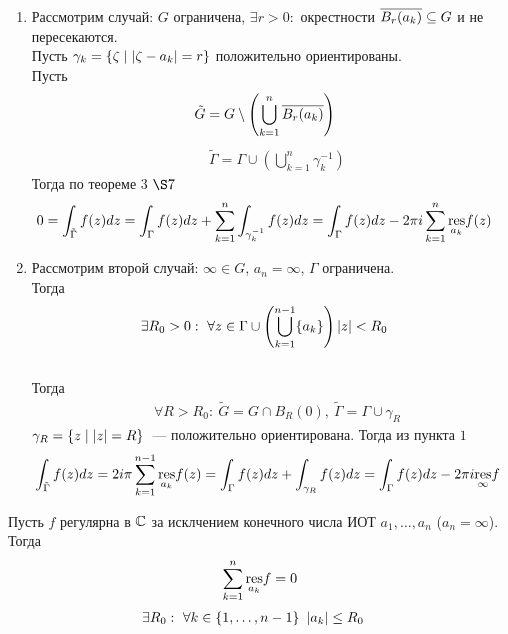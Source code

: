 \begin{enumerate}
    \item Рассмотрим случай: $G$ ограничена, $\exists r > 0:$ окрестности
    $\overline{B_r(a_k)}\subseteq G$ и не пересекаются.
    \\
    Пусть $\gamma_k = \{\zeta \mid \left|{\zeta - a_k}\right| = r\}$ положительно
    ориентированы.
    \\
    Пусть
    \begin{align*}
      & \tilde{G} = G \setminus \left( \bigcup_{k=1}^n\overline{B_r(a_k)} \right)
    \end{align*}
    \begin{align*}
      & \tilde{\Gamma} = \Gamma \cup \left( \bigcup_{k=1}^n  \gamma_k^{-1} \right)
    \end{align*}
    Тогда по теореме $3$ $\S7$
    \begin{align*}
      & 0 = \int_{\tilde{\Gamma}}f(z)dz =  \int_{\Gamma}f(z)dz + \sum_{k=1}^n\int_{\gamma_k^{-1}}f(z)dz =  \int_{\Gamma}f(z)dz -2 \pi i \sum_{k=1}^n\underset{a_k}{\mathrm{res}}f(z)
    \end{align*}
    \item Рассмотрим второй случай: $\infty \in G$, $a_n = \infty$, $\Gamma$
    ограничена.
    \\
    Тогда
    \begin{align*}
      & \exists R_0 > 0: \ \forall z \in \Gamma \cup \left( \bigcup_{k=1}^{n-1}\{a_k\} \right) \left|{z}\right| < R_0
    \end{align*}
    \\
    Тогда 
    \begin{align*}
      & \forall R > R_0: \ \tilde{G} = G \cap B_R(0), \ \tilde{\Gamma} = \Gamma \cup \gamma_R
    \end{align*}
    $\gamma_R = \{z \mid \left|{z}\right| = R\}$~--- положительно ориентирована.
    Тогда из пункта $1$
    \begin{align*}
      & \int_{\tilde{\Gamma}}f(z)dz = 2 i \pi \sum_{k=1}^{n-1}\underset{a_k}{\mathrm{res}}f(z) =  \int_{\Gamma}f(z)dz +  \int_{\gamma_R}f(z)dz =  \int_{\Gamma}f(z)dz - 2 \pi i \underset{\infty}{\mathrm{res}} f
    \end{align*}
\end{enumerate}
\corollary
Пусть $f$ регулярна в $\mathbb{C}$ за исклчением конечного числа ИОТ $a_1, \dots, a_n$
($a_n = \infty$). Тогда
\begin{equation}\label{(13.8)}
    \sum_{k=1}^n\underset{a_k}{\mathrm{res}}f = 0
\end{equation}
\pr
\begin{align*}
  & \exists R_0: \ \forall k \in \{1, \dots, n-1\} \ \left|{a_k}\right| \leq R_0
\end{align*}
